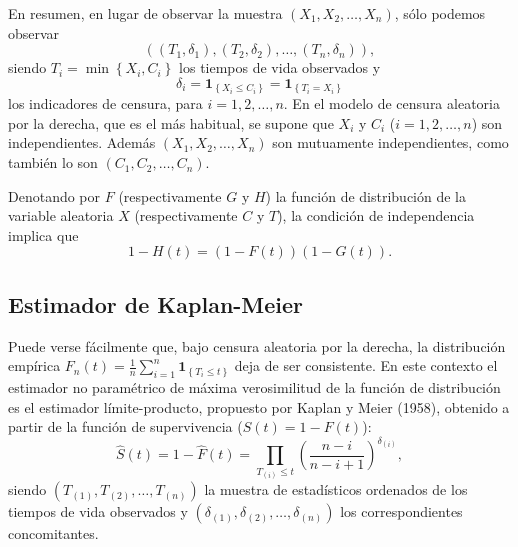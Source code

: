 \documentclass[
]{book}
\theoremstyle{break}
\theoremstyle{definition}
\theoremstyle{definition}
\theoremstyle{definition}
\theoremstyle{definition}
\theoremstyle{remark}
\begin{document}
En resumen, en lugar de observar la muestra
\(\left( X_1, X_2, \ldots, X_n \right)\), sólo podemos observar
\[\left( \left( T_1, \delta _1 \right), \left( T_2, \delta _2 \right),
\ldots ,\left( T_n, \delta_n \right) \right),\]
siendo \(T_i=\min \left\{ X_i,C_i\right\}\)
los tiempos de vida observados y
\[\delta _i=\mathbf{1}_{\left\{ X_i\leq
C_i\right\} }=\mathbf{1}_{\left\{ T_i=X_i\right\} }\]
los indicadores de censura, para \(i=1,2,\ldots ,n\).
En el modelo de censura aleatoria por la derecha,
que es el más habitual, se supone que \(X_i\)
y \(C_i\) (\(i=1,2,\ldots ,n\)) son independientes.
Además \(\left( X_1, X_2, \ldots ,X_n \right)\) son mutuamente independientes,
como también lo son \(\left( C_1, C_2,\ldots ,C_n \right)\).

Denotando por \(F\) (respectivamente \(G\) y \(H\)) la función de distribución
de la variable aleatoria \(X\) (respectivamente \(C\) y \(T\)), la condición
de independencia implica que
\[1-H\left( t \right) =\left( 1-F\left(
t \right) \right) \left( 1-G\left( t \right) \right).\]

\hypertarget{estimador-de-kaplan-meier}{%
\subsection{Estimador de Kaplan-Meier}\label{estimador-de-kaplan-meier}}

Puede verse fácilmente que, bajo censura aleatoria por la derecha, la
distribución empírica \(F_n\left( t \right) =\frac{1}{n} \sum_{i=1}^{n}\mathbf{1}_{\left\{ T_i\leq t\right\} }\) deja de ser
consistente. En este contexto el estimador no paramétrico de máxima
verosimilitud de la función de distribución es el estimador
límite-producto, propuesto por Kaplan y Meier (1958), obtenido
a partir de la función de supervivencia
(\(S\left( t \right) = 1-F\left( t \right)\)):
\[\hat{S}\left( t \right) = 1-\hat{F}\left( t \right) =
\prod_{T_{(i)}\leq t}\left( \frac{n-i}{n-i+1} \right)^{\delta _{(i)}},\]
siendo \(\left( T_{(1)},T_{\left( 2 \right)},\ldots ,T_{\left( n \right)} \right)\) la muestra de estadísticos ordenados de los tiempos
de vida observados y \(\left( \delta _{(1)},\delta _{\left(2 \right)}, \ldots ,\delta _{(n)} \right)\) los correspondientes concomitantes.
\end{document}
